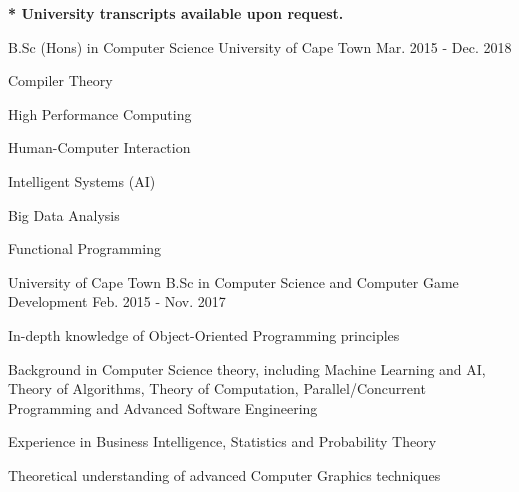 
\textbf{* University transcripts available upon request.}

\begin{cventries}

  \cventry
    {B.Sc (Hons) in Computer Science}
    {University of Cape Town}
    {Mar. 2015 - Dec. 2018}
    {}
    {
      \begin{cvitems}
        \item {Compiler Theory}
        \item {High Performance Computing}
        \item {Human-Computer Interaction}
        \item {Intelligent Systems (AI)}
        \item {Big Data Analysis}
        \item {Functional Programming}
      \end{cvitems}
    }
    
  \cventry
    {University of Cape Town}
    {B.Sc in Computer Science and Computer Game Development}
    {Feb. 2015 - Nov. 2017}
    {}
    {
      \begin{cvitems}
        \item {In-depth knowledge of Object-Oriented Programming principles}
        \item {Background in Computer Science theory, including Machine Learning and AI, Theory of Algorithms, Theory of Computation, Parallel/Concurrent Programming and Advanced Software Engineering}
        \item {Experience in Business Intelligence, Statistics and Probability Theory}
        \item {Theoretical understanding of advanced Computer Graphics techniques}
      \end{cvitems}
    }

\end{cventries}
